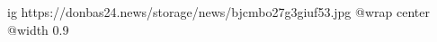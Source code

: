  
 
 
 
 

\ifcmt
  ig https://donbas24.news/storage/news/bjcmbo27g3giuf53.jpg
  @wrap center
  @width 0.9
\fi
